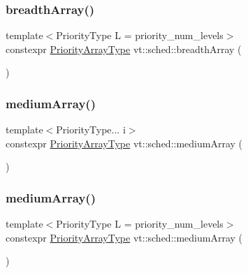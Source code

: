 \mbox{\label{namespacevt_1_1sched_ac82001576ed1c9cee962ed07113cebe7}} 
\subsubsection{\texorpdfstring{breadth\+Array()}{breadthArray()}\hspace{0.1cm}{\footnotesize\ttfamily [2/2]}}
{\footnotesize\ttfamily template$<$Priority\+Type L = priority\+\_\+num\+\_\+levels$>$ \\
constexpr \hyperlink{namespacevt_1_1sched_a2dbd1daff26f79efbff3f418ad9b2a8b}{Priority\+Array\+Type} vt\+::sched\+::breadth\+Array (\begin{DoxyParamCaption}{ }\end{DoxyParamCaption})}

\mbox{\label{namespacevt_1_1sched_a05afd033ab9ecc1f0d1dc37b8b9b7827}} 
\subsubsection{\texorpdfstring{medium\+Array()}{mediumArray()}\hspace{0.1cm}{\footnotesize\ttfamily [1/2]}}
{\footnotesize\ttfamily template$<$Priority\+Type... i$>$ \\
constexpr \hyperlink{namespacevt_1_1sched_a2dbd1daff26f79efbff3f418ad9b2a8b}{Priority\+Array\+Type} vt\+::sched\+::medium\+Array (\begin{DoxyParamCaption}\item[{std\+::integer\+\_\+sequence$<$ \hyperlink{namespacevt_a86bff9f556eb761b27fc8600d006ac04}{Priority\+Type}, i... $>$}]{ }\end{DoxyParamCaption})}

\mbox{\label{namespacevt_1_1sched_a3f4c11ddd24523a16b3f3606a4662014}} 
\subsubsection{\texorpdfstring{medium\+Array()}{mediumArray()}\hspace{0.1cm}{\footnotesize\ttfamily [2/2]}}
{\footnotesize\ttfamily template$<$Priority\+Type L = priority\+\_\+num\+\_\+levels$>$ \\
constexpr \hyperlink{namespacevt_1_1sched_a2dbd1daff26f79efbff3f418ad9b2a8b}{Priority\+Array\+Type} vt\+::sched\+::medium\+Array (\begin{DoxyParamCaption}{ }\end{DoxyParamCaption})}

